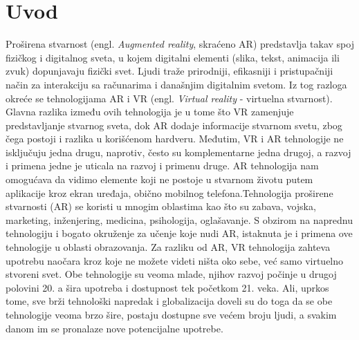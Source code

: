 \documentclass[a4paper]{article}
\begin{document}
	\section{Uvod}
	\label{sec:Uvod}
	Proširena stvarnost (engl. \emph{Augmented reality}, skraćeno AR) predstavlja takav spoj fizičkog i digitalnog sveta, u kojem digitalni elementi (slika, tekst, 
	animacija ili zvuk) dopunjavaju fizički svet. Ljudi traže prirodniji, efikasniji i pristupačniji način za interakciju sa računarima i današnjim digitalnim 
	svetom. Iz tog razloga okreće se tehnologijama AR i VR (engl. \emph{Virtual reality} - virtuelna stvarnost). Glavna razlika između ovih tehnologija je u tome što VR 
	zamenjuje predstavljanje stvarnog sveta, dok AR dodaje informacije stvarnom svetu, zbog čega postoji i razlika u korišćenom hardveru. Međutim, VR i AR 
	tehnologije ne isključuju jedna drugu, naprotiv, često su komplementarne jedna drugoj, a razvoj i primena jedne je uticala na razvoj i primenu druge. AR 
	tehnologija nam omogućava da vidimo elemente koji ne postoje u stvarnom životu putem aplikacije kroz ekran uređaja, obično mobilnog telefona.Tehnologija 
	proširene stvarnosti (AR) se koristi u mnogim oblastima kao što su zabava, vojska, marketing, inženjering, medicina, psihologija, oglašavanje. S obzirom na 
	naprednu tehnologiju i bogato okruženje za učenje koje nudi AR, istaknuta je i primena ove tehnologije u oblasti obrazovanja. Za razliku od AR, VR tehnologija 
	zahteva upotrebu naočara kroz koje ne možete videti ništa oko sebe, već samo virtuelno stvoreni svet. Obe tehnologije su veoma mlade, njihov razvoj počinje u 
	drugoj polovini 20. a šira upotreba i dostupnost tek početkom 21. veka. Ali, uprkos tome, sve brži tehnološki napredak i globalizacija doveli su do toga da se 
	obe tehnologije veoma brzo šire, postaju dostupne sve većem broju ljudi, a svakim danom im se pronalaze nove potencijalne upotrebe.
\end{document}
